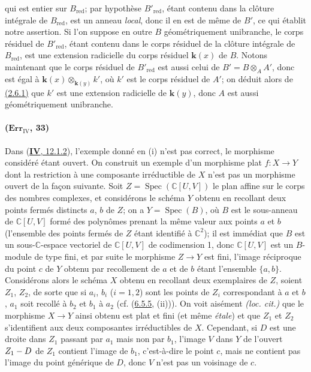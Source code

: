 qui est entier sur $B_{\mathrm{red}}$; par hypothèse
$B'_{\mathrm{red}}$, étant contenu dans la clôture intégrale de
$B_{\mathrm{red}}$, est un anneau \emph{local}, donc il en est de même de
$B'$, ce qui établit notre assertion.
Si l'on suppose en outre $B$ géométriquement unibranche, le corps
résiduel de $B'_{\mathrm{red}}$, étant contenu dans le corps résiduel de
la clôture intégrale de $B_{\mathrm{red}}$, est une extension radicielle
du corps résiduel $\boldsymbol{k}(x)$ de $B$. Notons maintenant que le corps résiduel
de $B'_{\mathrm{red}}$ est aussi celui de $B'=B\otimes_AA'$, donc est
égal à $\boldsymbol{k}(x)\otimes_{\mathbf{k}(y)}k'$, où $k'$ est le corps résiduel de $A'$;
on déduit alors de {\hyperref[canon-index.ega4.c04.prop.2-6-1]{(2.6.1)}} que $k'$
est une extension radicielle de $\boldsymbol{k}(y)$, donc $A$ est aussi
géométriquement unibranche.

\paragraph{($\mathbf{Err}_{\mathrm{IV}}$, 33)}
Dans ({\hyperref[canon-index.ega4.c04.item.12-1-2]{\textbf{IV}, 12.1.2}}), l'exemple donné
en (i) n'est pas correct, le morphisme considéré étant ouvert. On
construit un exemple d'un morphisme plat $f:X\to Y$ dont la restriction
à une composante irréductible de $X$ n'est pas un morphisme ouvert de
la façon suivante. Soit $Z=\operatorname{Spec}(\mathbb C[U,V])$ le
plan affine sur le corps des nombres complexes, et considérons le
schéma $Y$ obtenu en recollant deux points fermés distincts $a$, $b$ de
$Z$; on a $Y=\operatorname{Spec}(B)$, où $B$ est le sous-anneau de
$\mathbb C[U,V]$ formé des polynômes prenant la même valeur aux points
$a$ et $b$ (l'ensemble des points fermés de $Z$ étant identifié à
$\mathbb C^2$); il est immédiat que $B$ est un sous-$\mathbb C$-espace
vectoriel de $\mathbb C[U,V]$ de codimension 1, donc $\mathbb C[U,V]$
est un $B$-module de type fini, et par suite le morphisme $Z\to Y$ est
fini, l'image réciproque du point $c$ de $Y$ obtenu par recollement de
$a$ et de $b$ étant l'ensemble $\{a,b\}$.
Considérons alors le schéma $X$ obtenu en recollant deux exemplaires de
$Z$, soient $Z_1$, $Z_2$, de sorte que si $a_i$, $b_i$ ($i=1,2$) sont
les points de $Z_i$ correspondant à $a$ et $b$, $a_1$ soit recollé à
$b_2$ et $b_1$ à $a_2$ (cf. ({\hyperref[canon-index.ega4.c04.item.6-5-5]{6.5.5}},
(ii))). On voit aisément \emph{(loc. cit.)} que le morphisme $X\to Y$
ainsi obtenu est plat et fini (et même \emph{étale}) et que $Z_1$ et $Z_2$
s'identifient aux deux composantes irréductibles de $X$. Cependant, si
$D$ est une droite dans $Z_1$ passant par $a_1$ mais non par $b_1$,
l'image $V$ dans $Y$ de l'ouvert $Z_1- D$ de $Z_1$ contient l'image de
$b_1$, c'est-à-dire le point $c$, mais ne contient pas l'image du point
générique de $D$, donc $V$ n'est pas un voisinage de $c$.

